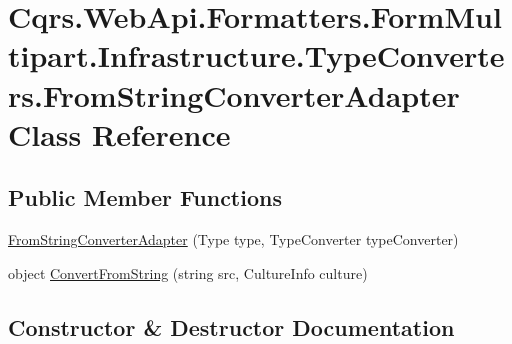 \hypertarget{classCqrs_1_1WebApi_1_1Formatters_1_1FormMultipart_1_1Infrastructure_1_1TypeConverters_1_1FromStringConverterAdapter}{}\section{Cqrs.\+Web\+Api.\+Formatters.\+Form\+Multipart.\+Infrastructure.\+Type\+Converters.\+From\+String\+Converter\+Adapter Class Reference}
\label{classCqrs_1_1WebApi_1_1Formatters_1_1FormMultipart_1_1Infrastructure_1_1TypeConverters_1_1FromStringConverterAdapter}
\subsection*{Public Member Functions}
\begin{DoxyCompactItemize}
\item 
\hyperlink{classCqrs_1_1WebApi_1_1Formatters_1_1FormMultipart_1_1Infrastructure_1_1TypeConverters_1_1FromStringConverterAdapter_a8861572dad983012fbe36488b2b6913a}{From\+String\+Converter\+Adapter} (Type type, Type\+Converter type\+Converter)
\item 
object \hyperlink{classCqrs_1_1WebApi_1_1Formatters_1_1FormMultipart_1_1Infrastructure_1_1TypeConverters_1_1FromStringConverterAdapter_a3990570c78f6b10af60fa126113205c1}{Convert\+From\+String} (string src, Culture\+Info culture)
\end{DoxyCompactItemize}


\subsection{Constructor \& Destructor Documentation}
\mbox{\label{classCqrs_1_1WebApi_1_1Formatters_1_1FormMultipart_1_1Infrastructure_1_1TypeConverters_1_1FromStringConverterAdapter_a8861572dad983012fbe36488b2b6913a}} 
